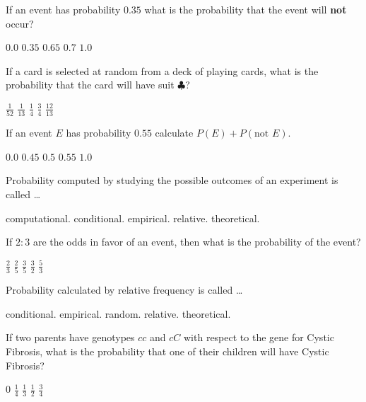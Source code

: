 \documentclass[answers,12pt]{exam}
\begin{document}
\begin{questions}
\question If an event has probability $0.35$
what is the probability that the event will {\bf not} occur?\\
\begin{oneparchoices}
\choice $0.0$
\choice $0.35$
\correctchoice $0.65$
\choice $0.7$
\choice $1.0$
\end{oneparchoices}

\question If a card is selected at random from a deck of
playing cards, what is the probability that
the card will have suit $\clubsuit$?\\
\begin{oneparchoices}
\choice $\frac{1}{52}$
\choice $\frac{1}{13}$
\correctchoice $\frac{1}{4}$
\choice $\frac{3}{4}$
\choice $\frac{12}{13}$
\end{oneparchoices}

\question If an event $E$ has probability $0.55$
calculate $P\left(E\right)+P\left(\text{not $E$}\right)$.\\
\begin{oneparchoices}
\choice $0.0$
\choice $0.45$
\choice $0.5$
\choice $0.55$
\correctchoice $1.0$
\end{oneparchoices}

\question Probability computed by studying
the possible outcomes of an experiment is called \dots\\
\begin{oneparchoices}
\choice computational.
\choice conditional.
\choice empirical.
\choice relative.
\correctchoice theoretical.
\end{oneparchoices}

\question If $2:3$ are the odds in favor
of an event, then what is the probability of the event?\\
\begin{oneparchoices}
\choice $\frac{2}{3}$ %
\correctchoice $\frac{2}{5}$
\choice $\frac{3}{5}$ %
\choice $\frac{3}{2}$ %
\choice $\frac{5}{3}$ %
\end{oneparchoices}

\question Probability calculated by relative frequency is called \dots\\
\begin{oneparchoices}
\choice conditional.
\correctchoice empirical.
\choice random.
\choice relative.
\choice theoretical.
\end{oneparchoices}

\question If two parents have genotypes $cc$ and $cC$
with respect to the gene for Cystic Fibrosis, what
is the probability that one of their children will have
Cystic Fibrosis?\\
\begin{oneparchoices}
\choice $0$
\choice $\frac{1}{4}$
\choice $\frac{1}{3}$
\correctchoice $\frac{1}{2}$
\choice $\frac{3}{4}$
\end{oneparchoices}

\end{questions}
\end{document}
